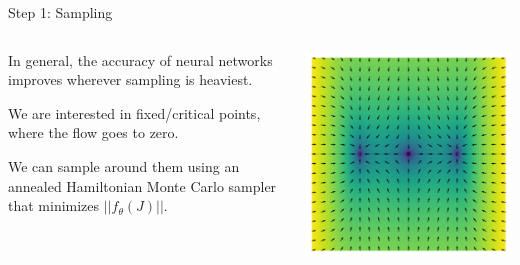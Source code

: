 \documentclass[aspectratio=169, 12pt]{beamer}
\begin{document}
\begin{frame}{Step 1: Sampling}

    \begin{columns}
        \begin{column}{.6\textwidth}
            
            In general, the accuracy of neural networks improves wherever sampling is heaviest. 

            \vspace{1em}

            We are interested in fixed/critical points, where the flow goes to zero. 

            \vspace{1em}

            We can sample around them using an annealed Hamiltonian Monte Carlo sampler that minimizes $|| f_\theta(J) ||$. 
            
        \end{column}
        \begin{column}{.4\textwidth}
            \includegraphics[width=\textwidth]{images/flow-heat.png}
        \end{column}
    \end{columns}
    
\end{frame}
\end{document}
